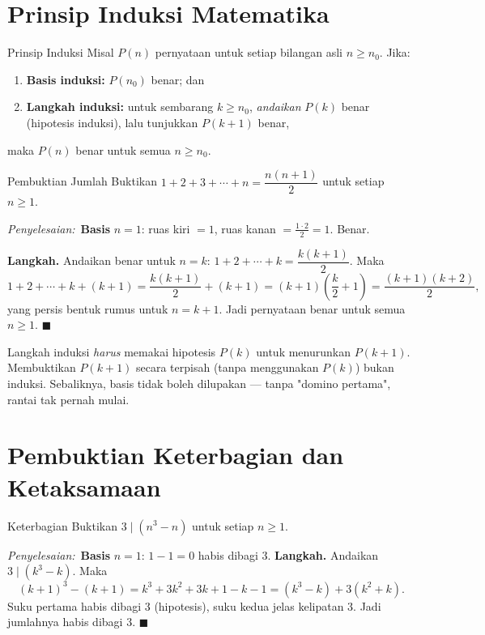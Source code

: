 \documentclass[11pt,a4paper]{report}
\theoremstyle{gaya}
\newcommand{\jawab}{\par\smallskip\noindent\textit{\textcolor{oranye}{Penyelesaian:}}\ }
\begin{document}
\section{Prinsip Induksi Matematika}
\begin{konsep}{Prinsip Induksi}
Misal $P(n)$ pernyataan untuk setiap bilangan asli $n\ge n_0$. Jika:
\begin{enumerate}[leftmargin=*,topsep=2pt,label=(\arabic*)]
  \item \textbf{Basis induksi:} $P(n_0)$ benar; dan
  \item \textbf{Langkah induksi:} untuk sembarang $k\ge n_0$, \emph{andaikan} $P(k)$ benar (hipotesis induksi), lalu tunjukkan $P(k+1)$ benar,
\end{enumerate}
maka $P(n)$ benar untuk semua $n\ge n_0$.
\end{konsep}

\begin{contoh}{Pembuktian Jumlah}
Buktikan $1+2+3+\cdots+n=\dfrac{n(n+1)}{2}$ untuk setiap $n\ge1$.

\jawab \textbf{Basis} $n=1$: ruas kiri $=1$, ruas kanan $=\tfrac{1\cdot2}{2}=1$. Benar.

\textbf{Langkah.} Andaikan benar untuk $n=k$: $1+2+\cdots+k=\dfrac{k(k+1)}{2}$. Maka
\[
1+2+\cdots+k+(k+1)=\frac{k(k+1)}{2}+(k+1)=(k+1)\!\left(\frac{k}{2}+1\right)=\frac{(k+1)(k+2)}{2},
\]
yang persis bentuk rumus untuk $n=k+1$. Jadi pernyataan benar untuk semua $n\ge1$. $\blacksquare$
\end{contoh}

\begin{kesalahan}
Langkah induksi \emph{harus} memakai hipotesis $P(k)$ untuk menurunkan $P(k+1)$. Membuktikan $P(k+1)$ secara terpisah (tanpa menggunakan $P(k)$) bukan induksi. Sebaliknya, basis tidak boleh dilupakan --- tanpa "domino pertama", rantai tak pernah mulai.
\end{kesalahan}

\section{Pembuktian Keterbagian dan Ketaksamaan}
\begin{contoh}{Keterbagian}
Buktikan $3\mid(n^3-n)$ untuk setiap $n\ge1$.

\jawab \textbf{Basis} $n=1$: $1-1=0$ habis dibagi $3$. \textbf{Langkah.} Andaikan $3\mid(k^3-k)$. Maka
\[
(k+1)^3-(k+1)=k^3+3k^2+3k+1-k-1=(k^3-k)+3(k^2+k).
\]
Suku pertama habis dibagi $3$ (hipotesis), suku kedua jelas kelipatan $3$. Jadi jumlahnya habis dibagi $3$. $\blacksquare$
\end{contoh}
\end{document}
